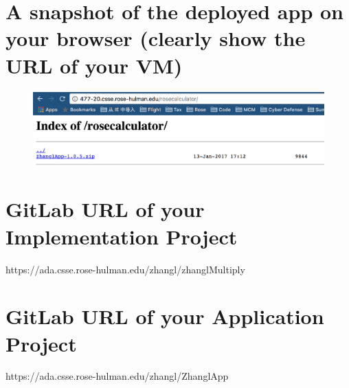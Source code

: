 \documentclass[12pt,letterpaper,boxed]{hmcpset}
\begin{document}
\section*{A snapshot  of  the deployed  app on  your  browser (clearly  show  the URL of  your  VM)}
\begin{figure}[H]
  \centering
  \includegraphics[width = 1.0\textwidth]{1.png}
\end{figure}
\section*{GitLab URL of your Implementation Project}
https://ada.csse.rose-hulman.edu/zhangl/zhanglMultiply
\section*{GitLab URL of your Application Project}
https://ada.csse.rose-hulman.edu/zhangl/ZhanglApp
\end{document}
